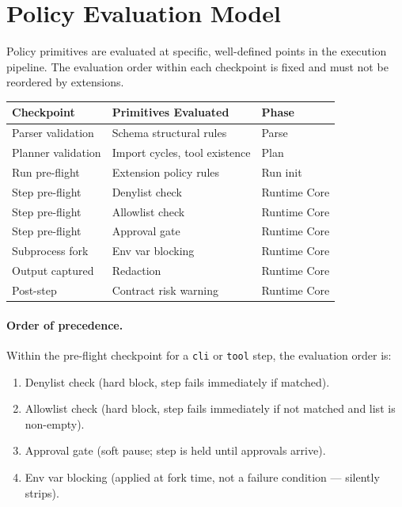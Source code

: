 \section{Policy Evaluation Model}
\label{sec:policy-eval}

Policy primitives are evaluated at specific, well-defined points in the execution pipeline.
The evaluation order within each checkpoint is fixed and must not be reordered by extensions.

\begin{center}
\begin{tabular}{lll}
\textbf{Checkpoint} & \textbf{Primitives Evaluated} & \textbf{Phase} \\
\hline
Parser validation & Schema structural rules & Parse \\
Planner validation & Import cycles, tool existence & Plan \\
Run pre-flight & Extension policy rules & Run init \\
Step pre-flight & Denylist check & Runtime Core \\
Step pre-flight & Allowlist check & Runtime Core \\
Step pre-flight & Approval gate & Runtime Core \\
Subprocess fork & Env var blocking & Runtime Core \\
Output captured & Redaction & Runtime Core \\
Post-step & Contract risk warning & Runtime Core \\
\end{tabular}
\end{center}

\paragraph{Order of precedence.}
Within the pre-flight checkpoint for a \texttt{cli} or \texttt{tool} step, the evaluation
order is:
\begin{enumerate}
  \item Denylist check (hard block, step fails immediately if matched).
  \item Allowlist check (hard block, step fails immediately if not matched and list is non-empty).
  \item Approval gate (soft pause; step is held until approvals arrive).
  \item Env var blocking (applied at fork time, not a failure condition — silently strips).
\end{enumerate}

